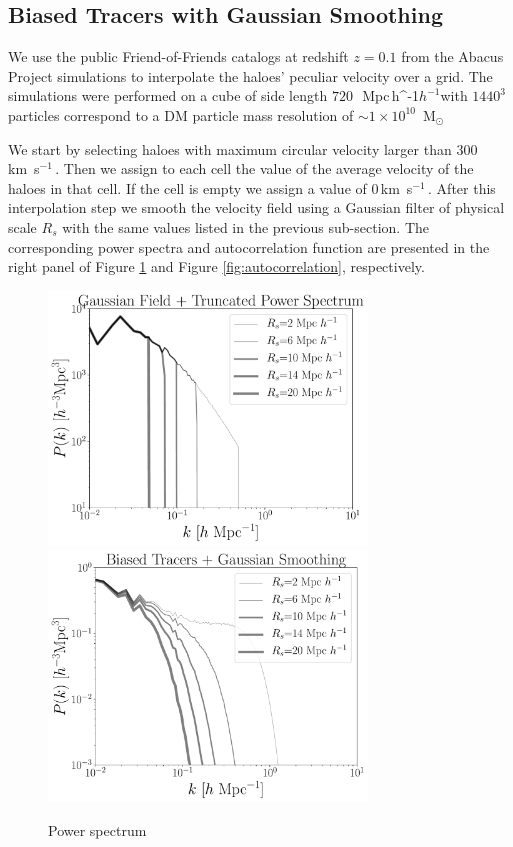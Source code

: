 \documentclass[usenatbib]{mnras}
\newcommand{\Msun}{\,{\rm M}$_{\odot}$\,}
\newcommand{\Mpch}{\,{\rm Mpc}\,\ifmmode h^{-1}\else $h^{-1}$\fi}
\newcommand{\kms}{\,{\rm km}\ s$^{-1}$\,}
\begin{document}
\subsection{Biased Tracers with Gaussian Smoothing}

We use the public Friend-of-Friends catalogs at redshift $z=0.1$
from the Abacus Project simulations to interpolate the haloes' peculiar velocity over a grid.
The simulations were performed on a cube of side length $720$\ \Mpch with
$1440^3$ particles correspond to a DM particle mass resolution
of $\sim 1 \times 10^{10}$ \Msun

We start by selecting haloes with maximum circular velocity larger
than $300$ \kms.
Then we assign to each cell the value of the average velocity of the haloes in that cell. 
If the cell is empty we assign a value of $0$\kms.
After this interpolation step we smooth the velocity field using a Gaussian filter of physical scale $R_s$ with the same values listed in the previous sub-section.
The corresponding power spectra and autocorrelation function are presented in the right panel of Figure \ref{fig:power_spectrum}
 and Figure \ref{fig:autocorrelation}, respectively.


\begin{figure}
    \centering
    \includegraphics[width=240pt]{plot_power_spectrum_field_rs.pdf}
    \includegraphics[width=240pt]{plot_power_spectrum_tracers_rs.pdf}
    \caption{Power spectrum}
    \label{fig:power_spectrum}
\end{figure}
\end{document}
